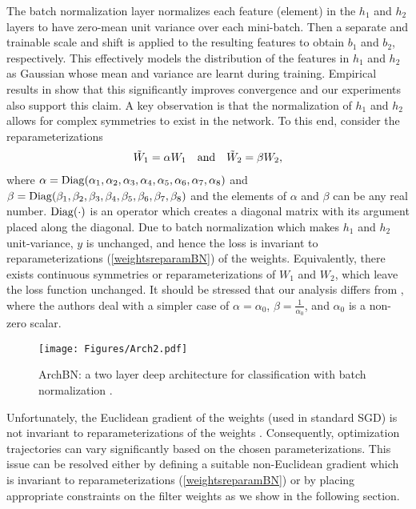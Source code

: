 \documentclass{article} %
\newcommand{\changeBM}[1]{#1} %
\newcommand{\changeVB}[1]{#1} %
\newcommand{\Diag}{{\rm Diag}}
\begin{document}
\changeVB{The batch normalization \cite{BN} layer normalizes each feature (element) in the $h_{1}$ and $h_{2}$ layers to have zero-mean unit variance over each mini-batch. Then a separate and trainable scale and shift is applied to the resulting features to obtain $b_{1}$ and $b_{2}$, respectively. This effectively models the distribution of the features in $h_{1}$ and $h_{2}$ as Gaussian whose mean and variance are learnt during training. Empirical results in  \cite{BN} show that this significantly improves convergence and our experiments also support this claim.} \changeBM{A key observation is that the} normalization of $h_{1}$ and $h_{2}$ allows for complex symmetries to exist in the network. \changeBM{To this end,} consider the reparameterizations
\begin{align}
\label{weightsreparamBN}
\tilde{W}_{1} =  \alpha W_{1} \quad {\rm and} \quad \tilde{W}_{2} =  \beta W_{2}, 
\end{align}
where $\mathbf{\alpha} = \Diag(\alpha_{1},\alpha_{2},\alpha_{3},\alpha_{4},\alpha_{5},\alpha_{6},\alpha_{7},\alpha_{8}) $ and $ \mathbf{\beta} = \Diag(\beta_{1},\beta_{2},\beta_{3},\beta_{4},\beta_{5},\beta_{6},\beta_{7},\beta_{8})$ and the elements of $\alpha$ and $\beta$ can be any real number. $\Diag(\cdot)$ is an operator which creates a diagonal matrix with its argument placed along the diagonal. Due to batch normalization which makes $h_1$ and $h_2$ unit-variance, $y$ is unchanged, and hence the loss is invariant to reparameterizations (\ref{weightsreparamBN}) of the weights. \changeBM{Equivalently}, there exists continuous symmetries or reparameterizations of $W_1$ and $W_2$, which leave the loss function unchanged. \changeBM{It should be stressed that our analysis differs from \cite{PathSGD}, where the authors deal with a simpler case of $\alpha = \alpha_{0}$, $\beta = \frac{1}{\alpha_{0}}$, and $\alpha_0$ is a non-zero scalar}. 


\begin{figure*}
\centering
\texttt{[image: Figures/Arch2.pdf]}
\caption{\footnotesize{ArchBN: a two layer deep architecture for classification with batch normalization \cite{BN}.}}
\label{ArchBN}
\end{figure*}

\changeVB{Unfortunately, the Euclidean gradient of the weights (used in standard SGD) is not invariant to reparameterizations of the weights \cite{PathSGD}. Consequently, optimization trajectories can vary significantly based on the chosen parameterizations. This issue can be resolved either by defining a suitable non-Euclidean gradient which is invariant to reparameterizations (\ref{weightsreparamBN}) or by placing appropriate constraints on the filter weights as we show in the following section.}
\end{document}
